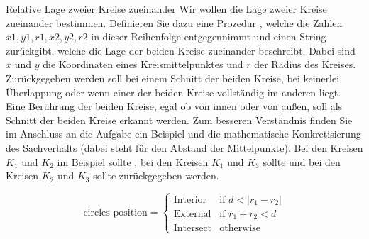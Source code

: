 \documentclass{../preamble}
\begin{document}
\clearpage

\begin{task}[credit = \stars{1}{3}]{Relative Lage zweier Kreise zueinander}
	Wir wollen die Lage zweier Kreise zueinander bestimmen. Definieren Sie dazu eine Prozedur , welche die Zahlen \(x1, y1, r1, x2, y2, r2\) in dieser Reihenfolge entgegennimmt und einen String zurückgibt, welche die Lage der beiden Kreise zueinander beschreibt. Dabei sind \(x\) und \(y\) die Koordinaten eines Kreismittelpunktes und \(r\) der Radius des Kreises.
	\br
	Zurückgegeben werden soll  bei einem Schnitt der beiden Kreise,  bei keinerlei Überlappung oder  wenn einer der beiden Kreise vollständig im anderen liegt. Eine Berührung der beiden Kreise, egal ob von innen oder von außen, soll als Schnitt der beiden Kreise erkannt werden.
	\br
	Zum besseren Verständnis finden Sie im Anschluss an die Aufgabe ein Beispiel und die mathematische Konkretisierung des  Sachverhalts (dabei steht  für den Abstand der Mittelpunkte). Bei den Kreisen \(K_1\) und \(K_2\) im Beispiel sollte , bei den Kreisen \(K_1\) und \(K_3\) sollte  und bei den Kreisen \(K_2\) und \(K_3\) sollte  zurückgegeben werden.

	\begin{minipage}{0.45 \linewidth}
		\begin{figure}[H]
			\centering
		\end{figure}
	\end{minipage}
	\begin{minipage}{0.45 \linewidth}
		\begin{equation*}
			\text{circles-position} =
			\begin{cases}
				\text{Interior}  & \text{if } d < \vert r_1 - r_2 \vert
				\\
				\text{External}  & \text{if } r_1 + r_2 < d
				\\
				\text{Intersect} & \text{otherwise}
			\end{cases}
		\end{equation*}
	\end{minipage}


\end{task}
\end{document}
